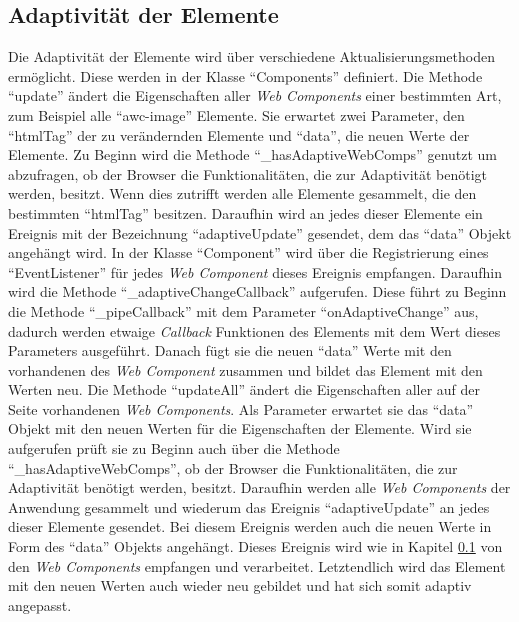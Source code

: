 \documentclass[12pt, paper=a4, bibtotoc, toc=listof, headsepline=true, numbers=endperiod]{scrreprt}
\begin{document}
	\subsection{Adaptivität der Elemente}
	\label{sec:adaDerEle}
	Die Adaptivität der Elemente wird über verschiedene Aktualisierungsmethoden ermöglicht. Diese werden in der Klasse \enquote{Components} definiert. Die Methode \enquote{update} ändert die Eigenschaften aller \emph{Web Components} einer bestimmten Art, zum Beispiel alle \enquote{awc-image} Elemente. Sie erwartet zwei Parameter, den \enquote{htmlTag} der zu verändernden Elemente und \enquote{data}, die neuen Werte der Elemente. Zu Beginn wird die Methode \enquote{\_hasAdaptiveWebComps} genutzt um abzufragen, ob der Browser die Funktionalitäten, die zur Adaptivität benötigt werden, besitzt. Wenn dies zutrifft werden alle Elemente gesammelt, die den bestimmten \enquote{htmlTag} besitzen. Daraufhin wird an jedes dieser Elemente ein Ereignis mit der Bezeichnung \enquote{adaptiveUpdate} gesendet, dem das \enquote{data} Objekt angehängt wird.
	In der Klasse \enquote{Component} wird über die Registrierung eines \enquote{EventListener} für jedes \emph{Web Component} dieses Ereignis empfangen. Daraufhin wird die Methode \enquote{\_adaptiveChangeCallback} aufgerufen. Diese führt zu Beginn die Methode \enquote{\_pipeCallback} mit dem Parameter \enquote{onAdaptiveChange} aus, dadurch werden etwaige \emph{Callback} Funktionen des Elements mit dem Wert dieses Parameters ausgeführt. Danach fügt sie die neuen \enquote{data} Werte mit den vorhandenen des \emph{Web Component} zusammen und bildet das Element mit den Werten neu.
	\newline
	Die Methode \enquote{updateAll} ändert die Eigenschaften aller auf der Seite vorhandenen \emph{Web Components}. Als Parameter erwartet sie das \enquote{data} Objekt mit den neuen Werten für die Eigenschaften der Elemente. Wird sie aufgerufen prüft sie zu Beginn auch über die Methode \enquote{\_hasAdaptiveWebComps}, ob der Browser die Funktionalitäten, die zur Adaptivität benötigt werden, besitzt. Daraufhin werden alle \emph{Web Components} der Anwendung gesammelt und wiederum das Ereignis \enquote{adaptiveUpdate} an jedes dieser Elemente gesendet. Bei diesem Ereignis werden auch die neuen Werte in Form des \enquote{data} Objekts angehängt. Dieses Ereignis wird wie in Kapitel \ref{sec:adaDerEle} von den \emph{Web Components} empfangen und verarbeitet. Letztendlich wird das Element mit den neuen Werten auch wieder neu gebildet und hat sich somit adaptiv angepasst.
	\newline
\end{document}
